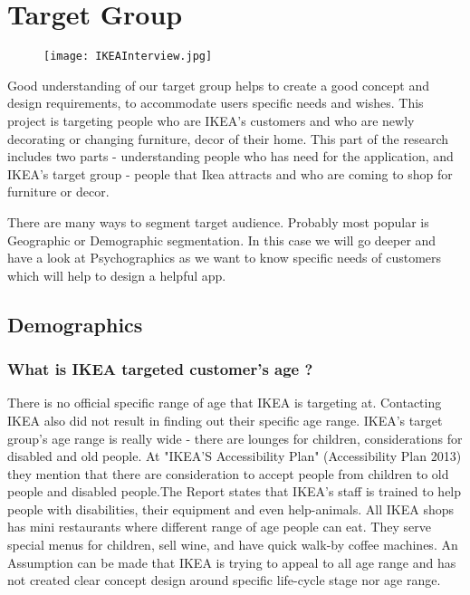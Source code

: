 \section{Target Group}
\begin{figure}[H]
\centering
\texttt{[image: IKEAInterview.jpg]}
\end{figure}
Good understanding of our target group helps to create a good concept and design requirements, to accommodate users specific needs and  wishes. 
This project is targeting people who are IKEA's customers and who are newly decorating or changing furniture, decor  of their home. This part of the research includes two parts - understanding people who has need for the application, and IKEA's target group - people that Ikea attracts  and who are coming to shop for furniture or decor.

There are many ways to segment target audience. Probably most popular is Geographic or Demographic segmentation. In this case we will go deeper and have a look at Psychographics as we want to know specific needs of customers which will help to design a helpful app. 
\subsection{Demographics }
\subsubsection{What is IKEA targeted customer's age ?}
There is no official specific range of age that IKEA is targeting at. Contacting IKEA also did not result in finding out their specific age range. IKEA's target group's age range is really wide - there are lounges for children, considerations for disabled and old people. At "IKEA'S Accessibility Plan" (Accessibility Plan 2013) they mention that there are consideration to accept people from children to old people and disabled people.The Report states that IKEA's staff is trained to help people with disabilities, their equipment and even help-animals. All IKEA shops has mini restaurants where different range of age people can eat. They serve special menus for children, sell wine, and have quick walk-by coffee machines. An Assumption can be made that IKEA is trying to appeal to all age range and has not created clear concept design around specific life-cycle stage  nor age range. 

